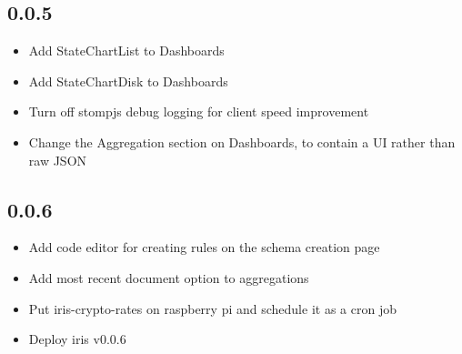 \documentclass[12pt]{report}
\begin{document}
\subsection{0.0.5}
\begin{itemize}
\item Add StateChartList to Dashboards
\item Add StateChartDisk to Dashboards
\item Turn off stompjs debug logging for client speed improvement
\item Change the Aggregation section on Dashboards, to contain a UI rather than raw JSON
\end{itemize}
\subsection{0.0.6}
\begin{itemize}
\item Add code editor for creating rules on the schema creation page
\item Add most recent document option to aggregations
\item Put iris-crypto-rates on raspberry pi and schedule it as a cron job
\item Deploy iris v0.0.6
\end{itemize}
\end{document}
